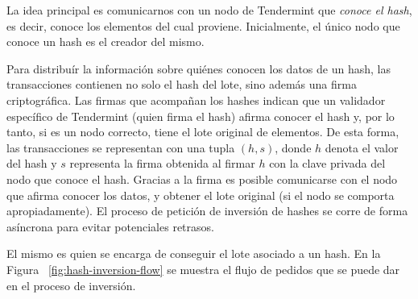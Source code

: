 La idea principal es comunicarnos con un nodo de Tendermint que \textit{conoce el hash}, es decir,
conoce los elementos del cual proviene.
%
Inicialmente, el único nodo que conoce un hash es el creador del mismo.
%

Para distribuír la información sobre quiénes conocen los datos de un hash, las transacciones contienen
no solo el hash del lote, sino además una firma criptográfica.
%
Las firmas que acompañan los hashes indican que un validador específico de Tendermint
(quien firma el hash) afirma conocer el hash y, por lo tanto, si es un nodo correcto,
tiene el lote original de elementos.
%
De esta forma, las transacciones se representan con una tupla $(h, s)$, donde $h$ denota
el valor del hash y $s$ representa la firma obtenida al firmar $h$ con la clave privada
del nodo que conoce el hash.
%
Gracias a la firma es posible comunicarse con el nodo que afirma conocer los datos, y obtener
el lote original (si el nodo se comporta apropiadamente).
%
El proceso de petición de inversión de hashes se corre de forma asíncrona para evitar potenciales
retrasos.

El \hcollector mismo es quien se encarga de conseguir el lote asociado a un hash.
%
En la Figura ~\ref{fig:hash-inversion-flow} se muestra el flujo de pedidos que se puede dar
en el proceso de inversión.

